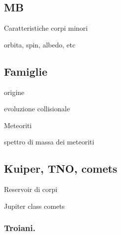 \subsection{MB}

\begin{frame}{Caratteristiche corpi minori}

\end{frame}

\begin{wordonframe}{orbita, spin, albedo, etc}

\end{wordonframe}

\subsection{Famiglie}

\begin{frame}{origine}

\end{frame}

\begin{wordonframe}{evoluzione collisionale}

\end{wordonframe}

\begin{frame}{Meteoriti}

\end{frame}

\begin{wordonframe}{spettro di massa dei meteoriti}

\end{wordonframe}

\subsection{Kuiper, TNO, comets}

\begin{frame}{Reservoir di corpi}

\end{frame}

\begin{wordonframe}{Jupiter class comets}

\end{wordonframe}


\subsubsection{Troiani.}

